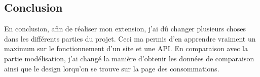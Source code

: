 \subsection{Conclusion}

\begin{flushleft}
En conclusion, afin de réaliser mon extension, j'ai dû changer plusieurs choses dans les différents parties du projet. Ceci ma permis d'en apprendre vraiment un maximum sur le fonctionnement d'un site et une API.
En comparaison avec la partie modélisation, j'ai changé la manière d'obtenir les données de comparaison ainsi que le design lorqu'on se trouve sur la page des consommations.
\end{flushleft}

